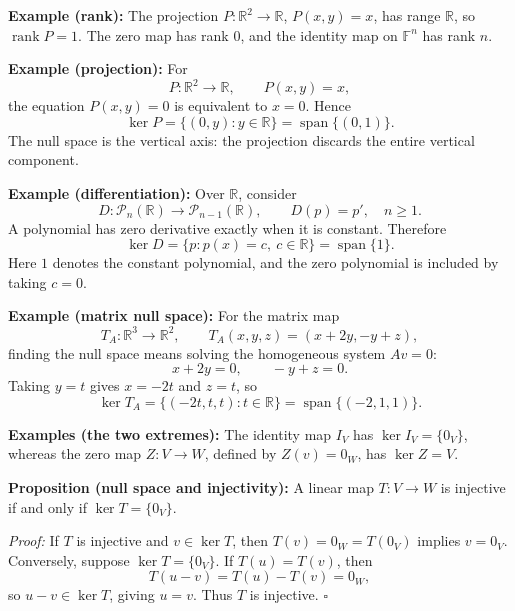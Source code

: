 \documentclass[a4paper,11pt,abstract=true]{scrartcl}
\theoremstyle{dotlessP}
\theoremstyle{dotlessS}
\theoremstyle{remark}
\theoremstyle{definition}
\begin{document}
\begin{example_box}
\textbf{Example (rank):} The projection
$P:\mathbb{R}^2\longrightarrow\mathbb{R}$, $P(x,y)=x$, has range
$\mathbb{R}$, so $\operatorname{rank}P=1$. The zero map has rank $0$,
and the identity map on $\mathbb{F}^n$ has rank $n$.
\end{example_box}

\begin{example_box}
\textbf{Example (projection):} For
\[
P:\mathbb{R}^2\longrightarrow\mathbb{R},\qquad P(x,y)=x,
\]
the equation $P(x,y)=0$ is equivalent to $x=0$. Hence
\[
\ker P=\{(0,y):y\in\mathbb{R}\}
=\operatorname{span}\{(0,1)\}.
\]
The null space is the vertical axis: the projection discards the entire
vertical component.
\end{example_box}

\begin{example_box}
\textbf{Example (differentiation):} Over $\mathbb{R}$, consider
\[
D:\mathcal{P}_n(\mathbb{R})\longrightarrow\mathcal{P}_{n-1}(\mathbb{R}),
\qquad D(p)=p',\quad n\geq1.
\]
A polynomial has zero derivative exactly when it is constant. Therefore
\[
\ker D=\{p:p(x)=c,\ c\in\mathbb{R}\}
=\operatorname{span}\{1\}.
\]
Here $1$ denotes the constant polynomial, and the zero polynomial is
included by taking $c=0$.
\end{example_box}

\begin{example_box}
\textbf{Example (matrix null space):} For the matrix map
\[
T_A:\mathbb{R}^3\longrightarrow\mathbb{R}^2,
\qquad T_A(x,y,z)=(x+2y,-y+z),
\]
finding the null space means solving the homogeneous system $Av=0$:
\[
x+2y=0,\qquad -y+z=0.
\]
Taking $y=t$ gives $x=-2t$ and $z=t$, so
\[
\ker T_A=\{(-2t,t,t):t\in\mathbb{R}\}
=\operatorname{span}\{(-2,1,1)\}.
\]
\end{example_box}

\begin{example_box}
\textbf{Examples (the two extremes):} The identity map $I_V$ has
$\ker I_V=\{0_V\}$, whereas the zero map $Z:V\longrightarrow W$,
defined by $Z(v)=0_W$, has $\ker Z=V$.
\end{example_box}

\begin{claim_box}
\textbf{Proposition (null space and injectivity):} A linear map
$T:V\longrightarrow W$ is injective if and only if $\ker T=\{0_V\}$.

\textit{Proof:} If $T$ is injective and $v\in\ker T$, then
$T(v)=0_W=T(0_V)$ implies $v=0_V$. Conversely, suppose
$\ker T=\{0_V\}$. If $T(u)=T(v)$, then
\[
T(u-v)=T(u)-T(v)=0_W,
\]
so $u-v\in\ker T$, giving $u=v$. Thus $T$ is injective.
\hfill$\square$
\end{claim_box}
\end{document}
